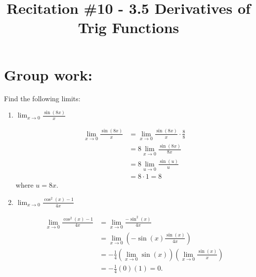 \documentclass[handout,nooutcomes]{ximera}
\title{Recitation \#10 - 3.5 Derivatives of Trig Functions}
\begin{document}
\begin{abstract}		\end{abstract}
\maketitle

	

\section*{Group work:}

\begin{problem}
Find the following limits:

	\begin{enumerate}
	
	\item  $\lim_{x \to 0} \frac{\sin(8x)}{x}$
			\begin{freeResponse}
			\begin{align*}
			\lim_{x \to 0} \frac{\sin(8x)}{x} &= \lim_{x \to 0} \frac{\sin(8x)}{x} \cdot \frac{8}{8}  \\
			&= 8 \lim_{x \to 0} \frac{\sin(8x)}{8x}  \\
			&= 8 \lim_{u \to 0} \frac{\sin(u)}{u}  \\
			&= 8 \cdot 1 = 8
			\end{align*}
			where $u = 8x$.  
			\end{freeResponse}
			
			
			
	\item  $\lim_{x \to 0} \frac{\cos^2(x) - 1}{4x}$
			\begin{freeResponse}
			\begin{align*}
			\lim_{x \to 0} \frac{\cos^2(x) - 1}{4x} &= \lim_{x \to 0} \frac{- \sin^2(x)}{4x}  \\
			&= \lim_{x \to 0} \left(- \sin(x) \frac{\sin(x)}{4x} \right)  \\
			&= - \frac{1}{4} \left( \lim_{x \to 0} \sin(x) \right) \left( \lim_{x \to 0} \frac{\sin(x)}{x} \right)  \\
			&= - \frac{1}{4} (0) (1) = 0.
			\end{align*}
			\end{freeResponse}
			
			
			

\end{enumerate}
\end{problem}
\end{document}
